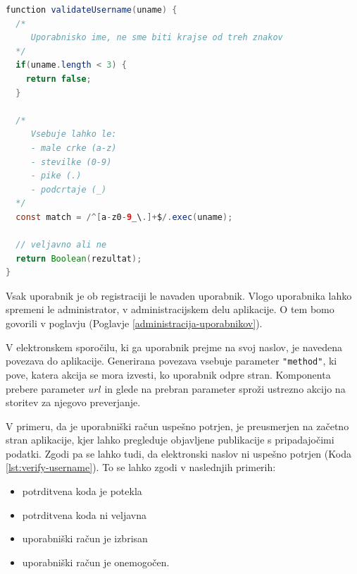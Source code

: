 \documentclass[a4paper, 12pt]{book}
\begin{document}
\clearpage

\begin{lstlisting}[language=java, style=mystyle, 
    caption={Primer validacijske funkcije za preverjanje uporabniškega imena z uporabo regularnega izraza.},label=lst:validation]
function validateUsername(uname) {
  /*
     Uporabnisko ime, ne sme biti krajse od treh znakov
  */
  if(uname.length < 3) {
    return false;
  }

  /*
     Vsebuje lahko le:
     - male crke (a-z)
     - stevilke (0-9)
     - pike (.)
     - podcrtaje (_)
  */
  const match = /^[a-z0-9_\.]+$/.exec(uname);

  // veljavno ali ne
  return Boolean(rezultat);
}
\end{lstlisting}

Vsak uporabnik je ob registraciji le navaden uporabnik. Vlogo uporabnika lahko spremeni le administrator, v administracijskem delu aplikacije. O tem bomo govorili v poglavju  (Poglavje \ref{administracija-uporabnikov}).

V elektronskem sporočilu, ki ga uporabnik prejme na svoj naslov, je navedena povezava do aplikacije. Generirana povezava vsebuje parameter \verb="method"=, ki pove, katera akcija se mora izvesti, ko uporabnik odpre stran. Komponenta prebere parameter $url$ in glede na prebran parameter sproži ustrezno akcijo na storitev za njegovo preverjanje.

V primeru, da je uporabniški račun uspešno potrjen, je preusmerjen na začetno stran aplikacije, kjer lahko pregleduje objavljene publikacije s pripadajočimi podatki. Zgodi pa se lahko tudi, da elektronski naslov ni uspešno potrjen (Koda \ref{lst:verify-username}). To se lahko zgodi v naslednjih primerih:
\begin{itemize}
\item potrditvena koda je potekla
\item potrditvena koda ni veljavna
\item uporabniški račun je izbrisan
\item uporabniški račun je onemogočen.
\end{itemize}
\end{document}
